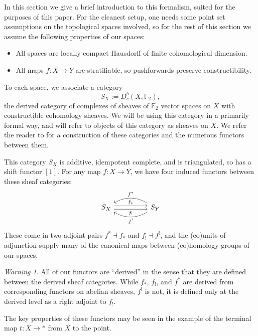 \documentclass{amsart}
\theoremstyle{definition}
\theoremstyle{remark}
\newtheorem{warning}[thm]{Warning}
\begin{document}
In this section we give a brief introduction to this formalism, suited for the purposes of this paper. For the cleanest setup, one needs some point set assumptions on the topological spaces involved, so for the rest of this section we assume the following properties of our spaces:
\begin{itemize}
    \item All spaces are locally compact Hausdorff of finite cohomological dimension.
    \item All maps $f:X\to Y$ are stratifiable, so pushforwards preserve constructibility.
\end{itemize}
To each space, we associate a category \[S_X:=D^b_c(X,\mathbb{F}_2),\] the derived category of complexes of sheaves of $\mathbb{F}_2$ vector spaces on $X$ with constructible cohomology sheaves. We will be using this category in a primarily formal way, and will refer to objects of this category as sheaves on $X$. We refer the reader to \cite{kashiwara2002sheaves} for a construction of these categories and the numerous functors between them. 

This category $S_X$ is additive, idempotent complete, and is triangulated, so has a shift functor $[1]$. For any map $f:X\to Y$, we have four induced functors between these sheaf categories:
\[\begin{tikzcd}
    S_X\arrow[rr,"f_*",shift left=1]\arrow[rr,"{f_!}"',shift right=1]&&S_Y \arrow[ll,bend left,"f^!"]\arrow[ll,bend right,"f^*"']
\end{tikzcd}\]
These come in two adjoint pairs $f^*\dashv f_*$ and $f_!\dashv f^!$, and the (co)units of adjunction supply many of the canonical maps between (co)homology groups of our spaces.

\begin{warning}
All of our functors are ``derived'' in the sense that they are defined between the derived sheaf categories. While $f_*$, $f_!$, and $f^*$ are derived from corresponding functors on abelian sheaves, $f^!$ is not, it is defined only at the derived level as a right adjoint to $f_!$.
\end{warning} 
The key properties of these functors may be seen in the example of the terminal map $t:X\to \ast$ from $X$ to the point.
\end{document}
